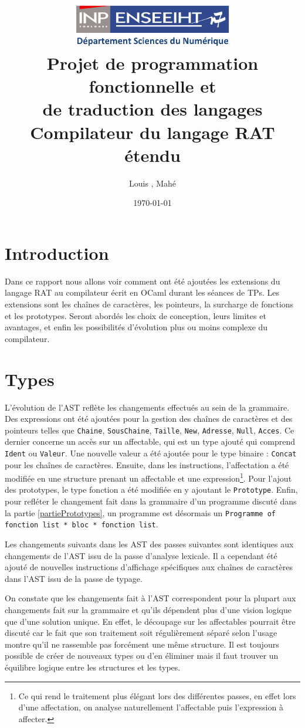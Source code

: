 \documentclass[11pt,a4paper]{article}
\title{\vspace{-1cm}\includegraphics[width=7cm]{n7.png}\\ Projet de programmation fonctionnelle et \\de traduction des langages\\ Compilateur du langage RAT étendu}
\author{Louis \bsc{Blenner}, Mahé \bsc{Tardy}}
\date{\today}
\begin{document}
\maketitle
\tableofcontents

\section{Introduction}
Dans ce rapport nous allons voir comment ont été ajoutées les extensions du langage RAT au compilateur écrit en OCaml durant les séances de TPs. Les extensions sont les chaînes de caractères, les pointeurs, la surcharge de fonctions et les prototypes. Seront abordés les choix de conception, leurs limites et avantages, et enfin les possibilités d'évolution plus ou moins complexe du compilateur.

\section{Types}

L'évolution de l'AST reflète les changements effectués au sein de la grammaire. Des expressions ont été ajoutées pour la gestion des chaînes de caractères et des pointeurs telles que \texttt{Chaine}, \texttt{SousChaine}, \texttt{Taille}, \texttt{New}, \texttt{Adresse}, \texttt{Null}, \texttt{Acces}. Ce dernier concerne un accès sur un affectable, qui est un type ajouté qui comprend \texttt{Ident} ou \texttt{Valeur}. Une nouvelle valeur a été ajoutée pour le type binaire : \texttt{Concat} pour les chaînes de caractères. Ensuite, dans les instructions, l'affectation a été modifiée en une structure prenant un affectable et une expression\footnote{Ce qui rend le traitement plus élégant lors des différentes passes, en effet lors d'une affectation, on analyse naturellement l'affectable puis l'expression à affecter.}. Pour l'ajout des prototypes, le type fonction a été modifiée en y ajoutant le \texttt{Prototype}. Enfin, pour refléter le changement fait dans la grammaire d'un programme discuté dans la partie \ref{partiePrototypes}, un programme est désormais un \texttt{Programme of fonction list * bloc * fonction list}.

Les changements suivants dans les AST des passes suivantes sont identiques aux changements de l'AST issu de la passe d'analyse lexicale. Il a cependant été ajouté de nouvelles instructions d'affichage spécifiques aux chaînes de caractères dans l'AST issu de la passe de typage.

On constate que les changements fait à l'AST correspondent pour la plupart aux changements fait sur la grammaire et qu'ils dépendent plus d'une vision logique que d'une solution unique. En effet, le découpage sur les affectables pourrait être discuté car le fait que son traitement soit régulièrement séparé selon l'usage montre qu'il ne rassemble pas forcément une même structure. Il est toujours possible de créer de nouveaux types ou d'en éliminer mais il faut trouver un équilibre logique entre les structures et les types.
\end{document}
